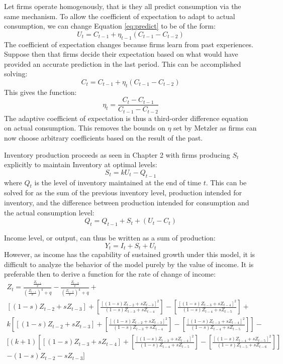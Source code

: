 Let firms operate homogenously, that is they all predict consumption via the same mechanism. To allow the coefficient of expectation to adapt to actual consumption, we can change Equation \ref{eq:predict} to be of the form:
\begin{equation}
    U_t=C_{t-1}+\eta_{t-1}(C_{t-1}-C_{t-2})
\end{equation}
The coefficient of expectation changes because firms learn from past experiences. Suppose then that firms decide their expectation based on what would have provided an accurate prediction in the last period. This can be accomplished solving:
\begin{equation*}
    C_t=C_{t-1}+\eta_t(C_{t-1}-C_{t-2})
\end{equation*}
This gives the function:
\begin{equation}
    \eta_t=\frac{C_t-C_{t-1}}{C_{t-1}-C_{t-2}}
\end{equation}
The adaptive coefficient of expectation is thus a third-order difference equation on actual consumption. This removes the bounds on $\eta$ set by Metzler as firms can now choose arbitrary coefficients based on the result of the past. 

Inventory production proceeds as seen in Chapter 2 with firms producing $S_t$ explicitly to maintain Inventory at optimal levels:
\begin{equation}
    S_t = k U_t-Q_{t-1}
\end{equation}
where $Q_t$ is the level of inventory maintained at the end of time $t$. This can be solved for as the sum of the previous inventory level, production intended for inventory, and the difference between production intended for consumption and the actual consumption level:
\begin{equation}
    Q_t=Q_{t-1}+S_t+(U_t-C_t)
\end{equation}

Income level, or output, can thus be written as a sum of production:
\begin{equation}
    Y_t=I_t+S_t+U_t
\end{equation}
However, as income has the capability of sustained growth under this model, it is difficult to analyze the behavior of the model purely by the value of income. It is preferable then to derive a function for the rate of change of income:
\begin{multline}
    Z_{t} = \frac{\frac{Z_{t-1}}{v}}{\left(\frac{Z_{t-1}}{v}\right)^4+q}-\frac{\frac{Z_{t-2}}{v}}{\left(\frac{Z_{t-2}}{v}\right)^4+q}+\\
    [(1-s)Z_{t-2}+sZ_{t-3}]+\left[\frac{[(1-s)Z_{t-2}+sZ_{t-3}]^2}{(1-s)Z_{t-3}+sZ_{t-4}}\right]-\left[\frac{[(1-s)Z_{t-3}+sZ_{t-4}]^2}{(1-s)Z_{t-4}+sZ_{t-5}}\right]+\\
    k\left[[(1-s)Z_{t-2}+sZ_{t-3}]+\left[\frac{[(1-s)Z_{t-2}+sZ_{t-3}]^2}{(1-s)Z_{t-3}+sZ_{t-4}}\right]-\left[\frac{[(1-s)Z_{t-3}+sZ_{t-4}]^2}{(1-s)Z_{t-4}+sZ_{t-5}}\right]\right]-\\
    [(k+1)\left[[(1-s)Z_{t-3}+sZ_{t-4}]+\left[\frac{[(1-s)Z_{t-3}+sZ_{t-4}]^2}{(1-s)Z_{t-4}+sZ_{t-5}}\right]-\left[\frac{[(1-s)Z_{t-4}+sZ_{t-5}]^2}{(1-s)Z_{t-5}+sZ_{t-6}}\right]\right]\\
    -(1-s)Z_{t-2}-sZ_{t-3}]
\end{multline}